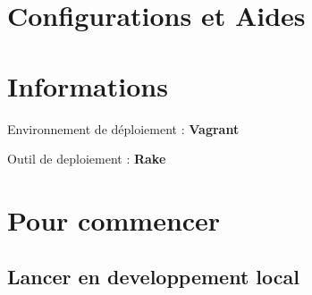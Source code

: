 \documentclass[a4paper,oneside,10pt]{article}
\begin{document}

\section{Configurations et Aides}






\section{Informations}

Environnement de déploiement : \textbf{Vagrant}

Outil de deploiement : \textbf{Rake}

\section{Pour commencer}

\subsection{Lancer en developpement local}
\end{document}
